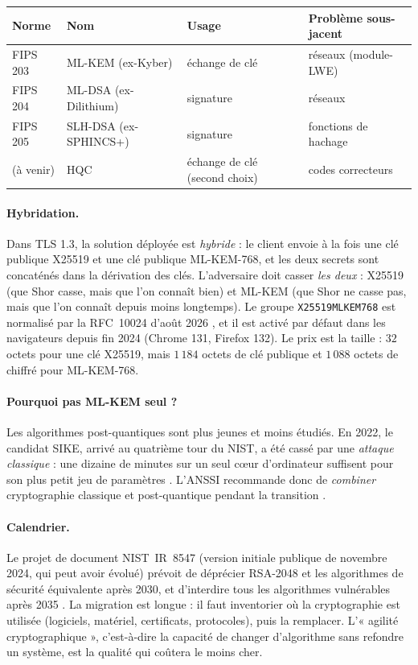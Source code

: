 \begin{center}
\renewcommand{\arraystretch}{1.2}
\begin{tabular}{@{}llll@{}}
\toprule
\textbf{Norme} & \textbf{Nom} & \textbf{Usage} & \textbf{Problème sous-jacent}\\
\midrule
FIPS 203 & ML-KEM (ex-Kyber) & échange de clé & réseaux (module-LWE)\\
FIPS 204 & ML-DSA (ex-Dilithium) & signature & réseaux\\
FIPS 205 & SLH-DSA (ex-SPHINCS+) & signature & fonctions de hachage\\
(à venir) & HQC & échange de clé (second choix) & codes correcteurs\\
\bottomrule
\end{tabular}
\end{center}

\paragraph{Hybridation.} Dans TLS 1.3, la solution déployée est \emph{hybride} : le client envoie à la fois une clé
publique X25519 et une clé publique ML-KEM-768, et les deux secrets sont concaténés dans la dérivation des clés. L'adversaire
doit casser \emph{les deux} : X25519 (que Shor casse, mais que l'on connaît bien) et ML-KEM (que Shor ne casse pas, mais
que l'on connaît depuis moins longtemps). Le groupe \texttt{X25519MLKEM768} est normalisé par la RFC~10024 d'août 2026
\parencite{rfc10024}, et il est activé par défaut dans les navigateurs depuis fin 2024 (Chrome 131, Firefox 132). Le
prix est la taille : $32$ octets pour une clé X25519, mais $1\,184$ octets de clé publique et $1\,088$ octets de
chiffré pour ML-KEM-768.

\paragraph{Pourquoi pas ML-KEM seul ?} Les algorithmes post-quantiques sont plus jeunes et moins étudiés. En 2022, le
candidat SIKE, arrivé au quatrième tour du NIST, a été cassé par une \emph{attaque classique} : une dizaine de minutes sur un seul
cœur d'ordinateur suffisent pour son plus petit jeu de paramètres \parencite{castryck2023}. L'ANSSI recommande donc de \emph{combiner} cryptographie classique et
post-quantique pendant la transition \parencite{anssi2024}.

\paragraph{Calendrier.} Le projet de document NIST~IR~8547 (version initiale publique de novembre 2024, qui peut
avoir évolué) prévoit de déprécier RSA-2048 et les algorithmes de sécurité équivalente après 2030, et d'interdire tous les
algorithmes vulnérables après 2035 \parencite{nistir8547}. La migration est longue : il faut inventorier où la cryptographie est
utilisée (logiciels, matériel, certificats, protocoles), puis la remplacer. L'« agilité cryptographique », c'est-à-dire
la capacité de changer d'algorithme sans refondre un système, est la qualité qui coûtera le moins cher.

